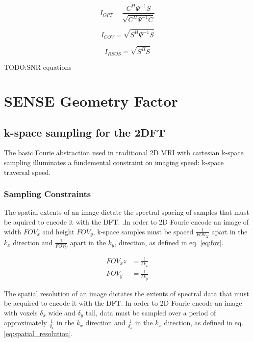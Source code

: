 \begin{equation} \label{eq:I_OPT}
I_{OPT}=\frac{C^H\Psi^{-1}S}{\sqrt{C^H\Psi^{-1}C}}
\end{equation}

\begin{equation} \label{eq:I_COV}
I_{COV}=\sqrt{S^H\Psi^{-1}S}
\end{equation}

\begin{equation} \label{eq:I_RSOS}
I_{RSOS}=\sqrt{S^{H} S}
\end{equation}

TODO:SNR equations

\section{SENSE Geometry Factor}

\subsection{k-space sampling for the 2DFT}
The basic Fourie abstraction used in traditional 2D MRI with cartesian k-space sampling illuminates a fundemental
constraint on imaging speed: k-space traversal speed.

\subsubsection{Sampling Constraints}
The spatial extents of an image dictate the spectral spacing of samples that must be aquired to encode it with the DFT.
\cite{nishimura} .In order to 2D Fourie encode an image of width $FOV_x$ and height $FOV_y$, k-space samples must be
spaced $\frac{1}{FOV_X}$ apart in the $k_x$ direction and $\frac{1}{FOV_Y}$ apart in the $k_y$, direction, as defined in
eq. \ref{eq:fov}.

\begin{equation}\label{eq:fov}
    \begin{aligned}
        FOV_x z &= \frac{1}{\delta k_x}\\
        FOV_y &= \frac{1}{\delta k_y}
    \end{aligned}
\end{equation}

The spatial resolution of an image dictates the extents of spectral data that must be acquired to encode it with the
DFT. In order to 2D Fourie encode an image with voxels $\delta_x$ wide and $\delta_y$ tall, data must be sampled over a
period of approximately $\frac{1}{\delta_x}$ in the $k_x$ direction and $\frac{1}{\delta_x}$ in the $k_x$ direction, as
defined in eq. \ref{eq:spatial_resolution}.


